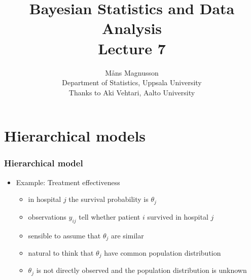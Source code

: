 \documentclass[10pt]{beamer}
\title[]{{\color{black}Bayesian Statistics and Data Analysis \\ Lecture 7}}
\author[]{M{\aa}ns Magnusson \\ Department of Statistics, Uppsala University \\ Thanks to Aki Vehtari, Aalto University}
\date{}
\begin{document}
\frame{\titlepage
}



\section{Hierarchical models}
\frame{\sectionpage}

\begin{frame}

\frametitle{Hierarchical model}

  \begin{itemize}
  \item Example: Treatment effectiveness
    \begin{itemize}
    \item in hospital $j$ the survival probability is $\theta_j$
    \item observations $y_{ij}$ tell whether patient $i$ survived in
      hospital $j$
        \begin{xy}
        \end{xy}
        \pause
      \item sensible to assume that $\theta_j$ are similar
        \begin{xy}
        \end{xy}
      \item natural to think that $\theta_j$ have common population distribution
      \item $\theta_j$ is not directly observed and the population distribution is unknown
    \end{itemize}
  \end{itemize}
\end{frame}
\end{document}
